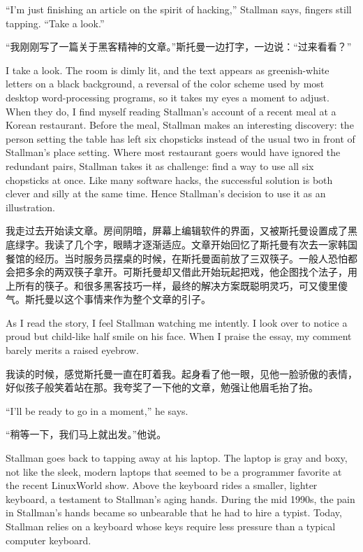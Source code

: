 \ifdefined\eng
``I'm just finishing an article on the spirit of hacking,'' Stallman says, fingers still tapping. ``Take a look.''
\fi

\ifdefined\chs
``我刚刚写了一篇关于黑客精神的文章。''斯托曼一边打字，一边说：``过来看看？''
\fi

\ifdefined\eng
I take a look. The room is dimly lit, and the text appears as greenish-white letters on a black background, a reversal of the color scheme used by most desktop word-processing programs, so it takes my eyes a moment to adjust. When they do, I find myself reading Stallman's account of a recent meal at a Korean restaurant. Before the meal, Stallman makes an interesting discovery: the person setting the table has left six chopsticks instead of the usual two in front of Stallman's place setting. Where most restaurant goers would have ignored the redundant pairs, Stallman takes it as challenge: find a way to use all six chopsticks at once. Like many software hacks, the successful solution is both clever and silly at the same time. Hence Stallman's decision to use it as an illustration.
\fi

\ifdefined\chs
我走过去开始读文章。房间阴暗，屏幕上编辑软件的界面，又被斯托曼设置成了黑底绿字。我读了几个字，眼睛才逐渐适应。文章开始回忆了斯托曼有次去一家韩国餐馆的经历。当时服务员摆桌的时候，在斯托曼面前放了三双筷子。一般人恐怕都会把多余的两双筷子拿开。可斯托曼却又借此开始玩起把戏，他企图找个法子，用上所有的筷子。和很多黑客技巧一样，最终的解决方案既聪明灵巧，可又傻里傻气。斯托曼以这个事情来作为整个文章的引子。
\fi

\ifdefined\eng
As I read the story, I feel Stallman watching me intently. I look over to notice a proud but child-like half smile on his face. When I praise the essay, my comment barely merits a raised eyebrow.
\fi

\ifdefined\chs
我读的时候，感觉斯托曼一直在盯着我。起身看了他一眼，见他一脸骄傲的表情，好似孩子般笑着站在那。我夸奖了一下他的文章，勉强让他眉毛抬了抬。
\fi

\ifdefined\eng
``I'll be ready to go in a moment,'' he says.
\fi

\ifdefined\chs
``稍等一下，我们马上就出发。''他说。
\fi

\ifdefined\eng
Stallman goes back to tapping away at his laptop. The laptop is gray and boxy, not like the sleek, modern laptops that seemed to be a programmer favorite at the recent LinuxWorld show. Above the keyboard rides a smaller, lighter keyboard, a testament to Stallman's aging hands. During the mid 1990s, the pain in Stallman's hands became so unbearable that he had to hire a typist. Today, Stallman relies on a keyboard whose keys require less pressure than a typical computer keyboard.
\fi

